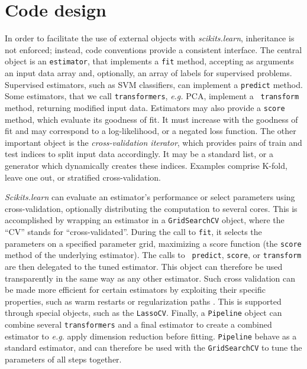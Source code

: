 \documentclass[twoside,11pt]{article}
\begin{document}

\section{Code design}

%
In order to facilitate the use of external objects with \emph{scikits.learn},
inheritance is not enforced; instead, code
conventions provide a consistent interface.
The central object is an {\tt estimator}, that implements a
{\tt fit} method, accepting as arguments an input data array and,
optionally, an array of labels for supervised problems. Supervised estimators,
such as SVM classifiers, can implement a {\tt predict} method. Some estimators,
that we call {\tt transformers}, \emph{e.g.} PCA, implement a {\tt
transform} method, returning modified input data.
%
Estimators may also provide a {\tt score} method, which evaluate its
goodness of fit. It must increase with the goodness of fit and
may correspond to a log-likelihood, or a negated loss function.
%
The other important object is the \emph{cross-validation iterator},
which provides pairs of train and test indices to split input
data accordingly. It may be a standard list, or a generator
which dynamically
creates these indices.
Examples comprise K-fold,
leave one out, or
stratified cross-validation.


\smallskip {}
%
\emph{Scikits.learn} can evaluate an estimator's performance or select
parameters using cross-validation, optionally distributing the
computation to several cores.
This is accomplished by wrapping an estimator in a {\tt GridSearchCV}
object, where the ``CV'' stands for ``cross-validated''.
During the call to {\tt fit}, it selects the parameters
on a specified parameter grid, maximizing a score function
(the {\tt score} method of the underlying estimator). The calls to {\tt
predict}, {\tt score}, or {\tt transform} are then delegated to the tuned
estimator. This object can therefore be used transparently in the same
way as any other
estimator.
Such cross validation can be made more efficient for certain
estimators by exploiting their specific properties, such as warm restarts
or regularization paths \citep{friedman2010}. This is supported through special
objects, such as the {\tt LassoCV}.
%
Finally, a {\tt Pipeline} object can
combine several {\tt transformers} and a final estimator to create a
combined estimator to \emph{e.g.} apply dimension reduction before
fitting. {\tt Pipeline} behave as a standard estimator, and can
therefore be used
with the {\tt GridSearchCV} to tune the parameters of all steps together.
\end{document}
